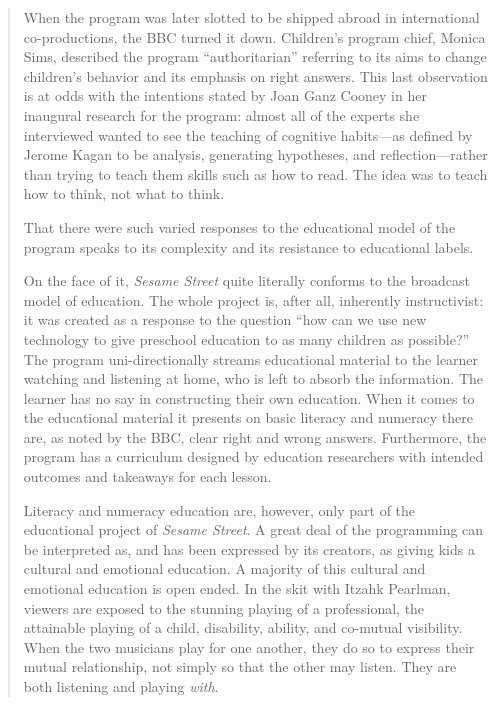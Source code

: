 \documentclass[12pt,letterpaper]{article}
\begin{document}
\begin{quote}
	When the program was later slotted to be shipped abroad in 
	international co-productions, the BBC turned it down. Children's 
	program chief, Monica Sims, described the program ``authoritarian'' 
	referring to its aims to change children's behavior and its emphasis on 
	right answers.\autocite[211]{Davis} This last observation is at odds
	with the intentions stated by Joan Ganz Cooney in her inaugural
	research for the program: almost all of the experts she interviewed 
	wanted to see the teaching of cognitive habits---as defined by Jerome 
	Kagan to be analysis, generating hypotheses, and reflection---rather 
	than trying to teach them skills such as how to read. The idea was to
	teach how to think, not what to think.\autocite[23]{Cooney}

	That there were such varied responses to the educational model of the
	program speaks to its complexity and its resistance to educational 
	labels. 
	
	On the face of it, \textit{Sesame Street} quite literally conforms to 
	the broadcast model of education. The whole project is, after all, 
	inherently instructivist: it was created as a response to the question
	``how can we use new technology to give preschool education to as many 
	children as possible?'' The program 
	uni-directionally streams educational material to the learner watching 
	and listening at home, who is left to absorb the information. The 
	learner has no say in constructing their own education. When it comes to
	the educational material it presents on basic literacy and numeracy 
	there are, as noted by the BBC, clear right and wrong answers. 
	Furthermore, the program has a curriculum 
	designed by education researchers with intended outcomes and takeaways 
	for each lesson.\autocite[117]{Davis} 

	Literacy and numeracy education are, however, only part of the 
	educational project of \textit{Sesame Street}. A great deal of the 
	programming can be interpreted as, and has been expressed by its 
	creators, as giving kids a cultural and emotional 
	education.\autocite[297]{Ostrofsky2012}
	A majority of this cultural and emotional education is open ended. 
	In the skit with Itzahk Pearlman, viewers are exposed to the stunning 
	playing of a professional, the attainable playing of a child, 
	disability, ability, and co-mutual visibility. When the two musicians 
	play for one another, they do so to express their mutual relationship, 
	not simply so that the other may listen. They are both listening and 
	playing \textit{with}. 


\end{quote}
\end{document}
